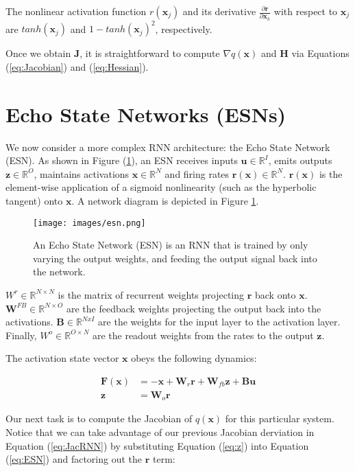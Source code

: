 \documentclass{article} %
\newcommand{\bf}[1]{\mathbf{#1}}
\newcommand{\x}{\bf{x}}
\newcommand{\J}{\bf{J}}
\newcommand{\p}{\partial}
\newcommand{\pf}[2]{\frac{\p{#1}}{\p{#2}}}
\begin{document}
The nonlinear activation function $r(\x_j)$ and its derivative $\pf{\bf{r}}{\x_k}$ with respect to $\x_j$ are $tanh(\x_j)$ and $1-tanh(\x_j)^2$, respectively.

Once we obtain $\J$, it is straightforward to compute $\nabla q(\x)$ and $\bf{H}$ via Equations (\ref{eq:Jacobian}) and (\ref{eq:Hessian}).

\section{Echo State Networks (ESNs)}

We now consider a more complex RNN architecture: the Echo State Network (ESN). As shown in Figure (\ref{fig:esn_arch}), an ESN receives inputs $\bf{u} \in \mathbb{R}^I$, emits outputs $\bf{z} \in \mathbb{R}^O$, maintains activations $\x \in \mathbb{R}^N$ and firing rates $\bf{r}(\x) \in \mathbb{R}^N$. $\bf{r}(\x)$ is the element-wise application of a sigmoid nonlinearity (such as the hyperbolic tangent) onto $\x$. A network diagram is depicted in Figure \ref{fig:esn_arch}.

\begin{figure}
\centering
\texttt{[image: images/esn.png]}
\caption{An Echo State Network (ESN) is an RNN that is trained by only varying the output weights, and feeding the output signal back into the network.}
\label{fig:esn_arch}
\end{figure}

$W^r \in \mathbb{R}^{N \times N}$ is the matrix of recurrent weights projecting $\bf{r}$ back onto $\x$. $\bf{W}^{FB} \in \mathbb{R}^{N \times O}$ are the feedback weights projecting the output back into the activations.
$\bf{B} \in \mathbb{R}^{N x I}$ are the weights for the input layer to the activation layer. Finally, $W^o \in \mathbb{R}^{O \times N}$ are the readout weights from the rates to the output $\bf{z}$.

The activation state vector $\x$ obeys the following dynamics:

\begin{align}
  \bf{F}(\x) &= -\x + \bf{W}_{r}\bf{r}+\bf{W}_{fb}{\bf{z}}+\bf{B}\bf{u} \label{eq:ESN} \\
  \bf{z} &= \bf{W}_o \bf{r} \label{eq:z}
\end{align}

Our next task is to compute the Jacobian of $q(\x)$ for this particular system. Notice that we can take advantage of our previous Jacobian derviation in Equation (\ref{eq:JacRNN}) by substituting Equation (\ref{eq:z}) into Equation (\ref{eq:ESN}) and factoring out the $\bf{r}$ term:
\end{document}
